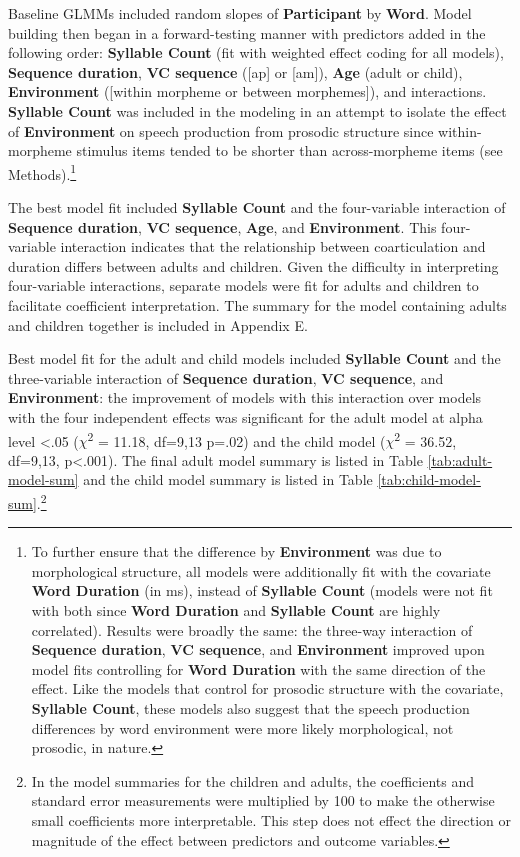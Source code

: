 \documentclass[
]{article}
\begin{document}
Baseline GLMMs included random slopes of \textbf{Participant} by \textbf{Word}. Model building then began in a forward-testing manner with predictors added in the following order: \textbf{Syllable Count} (fit with weighted effect coding for all models), \textbf{Sequence duration}, \textbf{VC sequence} ({[}ap{]} or {[}am{]}), \textbf{Age} (adult or child), \textbf{Environment} ({[}within morpheme or between morphemes{]}), and interactions. \textbf{Syllable Count} was included in the modeling in an attempt to isolate the effect of \textbf{Environment} on speech production from prosodic structure since within-morpheme stimulus items tended to be shorter than across-morpheme items (see Methods).\footnote{To further ensure that the difference by \textbf{Environment} was due to morphological structure, all models were additionally fit with the covariate \textbf{Word Duration} (in ms), instead of \textbf{Syllable Count} (models were not fit with both since \textbf{Word Duration} and \textbf{Syllable Count} are highly correlated). Results were broadly the same: the three-way interaction of \textbf{Sequence duration}, \textbf{VC sequence}, and \textbf{Environment} improved upon model fits controlling for \textbf{Word Duration} with the same direction of the effect. Like the models that control for prosodic structure with the covariate, \textbf{Syllable Count}, these models also suggest that the speech production differences by word environment were more likely morphological, not prosodic, in nature.}

The best model fit included \textbf{Syllable Count} and the four-variable interaction of \textbf{Sequence duration}, \textbf{VC sequence}, \textbf{Age}, and \textbf{Environment}. This four-variable interaction indicates that the relationship between coarticulation and duration differs between adults and children. Given the difficulty in interpreting four-variable interactions, separate models were fit for adults and children to facilitate coefficient interpretation. The summary for the model containing adults and children together is included in Appendix E.

Best model fit for the adult and child models included \textbf{Syllable Count} and the three-variable interaction of \textbf{Sequence duration}, \textbf{VC sequence}, and \textbf{Environment}: the improvement of models with this interaction over models with the four independent effects was significant for the adult model at alpha level \textless.05 (\(\chi\)\textsuperscript{2} = 11.18, df=9,13 p=.02) and the child model (\(\chi\)\textsuperscript{2} = 36.52, df=9,13, p\textless.001). The final adult model summary is listed in Table \ref{tab:adult-model-sum} and the child model summary is listed in Table \ref{tab:child-model-sum}.\footnote{In the model summaries for the children and adults, the coefficients and standard error measurements were multiplied by 100 to make the otherwise small coefficients more interpretable. This step does not effect the direction or magnitude of the effect between predictors and outcome variables.}
\end{document}
